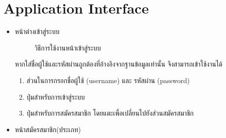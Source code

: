 \documentclass[12pt,oneside,openright,a4paper]{cpe-thai-project}
\begin{document}
\section{Application Interface}
\begin{itemize}
  \item หน้าต่างเข้าสู่ระบบ
  \begin{figure}[!ht]\centering
    \setlength{\fboxrule}{0.2mm} %
    \setlength{\fboxsep}{1cm}
    \caption{วิธีการใช้งานหน้าเข้าสู่ระบบ}\label{fig:system}
  \end{figure}
  หากใส่ชื่อผู้ใช้และรหัสผ่านถูกต้องที่อ้างอิงจากฐานข้อมูลเท่านั้น จึงสามารถเข้าใช้งานได้
  \begin{enumerate}
    \item ส่วนในการกรอกชื่อผู้ใช้ (username) และ รหัสผ่าน (password)
    \item ปุ่มสำหรับการเข้าสู่ระบบ
    \item ปุ่มสำหรับการสมัครสมาชิก โดยแตะเพื่อเปลี่ยนไปยังส่วนสมัครสมาชิก
  \end{enumerate} 
  \newpage
  \item หน้าสมัครสมาชิก(ประเภท)
  \begin{figure}[!ht]\centering
    \setlength{\fboxrule}{0.2mm} %
    \setlength{\fboxsep}{1cm}

\end{figure}
\end{itemize}
\end{document}
